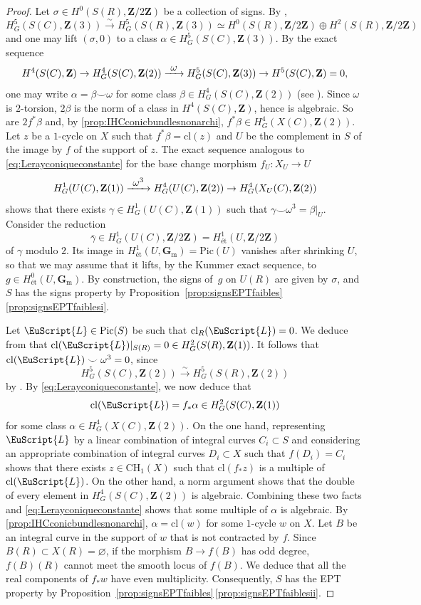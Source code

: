 \documentclass[JEP,XML,SOM,Unicode]{cedram}
\let\mathcal\EuScript
\newcommand{\To}[1]{\mathchoice{\xrightarrow{\textstyle\kern4pt#1\kern3pt}}{\stackrel{#1}{\longrightarrow}}{}{}}
\newcommand{\isom}{\stackrel{\sim}{\longrightarrow}}
\theoremstyle{plain}
\theoremstyle{definition}
\numberwithin{equation}{section}
\newcommand{\cl}{{\mathrm{cl}}}
\newcommand{\Gm}{\mathbf{G}_\mathrm{m}}
\newcommand{\Z}{{\mathbf Z}}
\newcommand{\CH}{\mathrm{CH}}
\newcommand{\Pic}{\mathrm{Pic}}
\renewcommand{\emptyset}{\varnothing}
\newcommand{\et}{\text{ét}}
\begin{document}
\begin{proof}
Let $\sigma\in H^0(S(R),\Z/2\Z)$ be a collection of signs. By \cite[\S\ref*{BW1-subsubsec:cohomological dimension}, (\ref*{BW1-eq:canonical decomposition})]{BW1},
\[
H_G^5(S(C),\Z(3))\isom H_G^5(S(R),\Z(3))\simeq H^0(S(R),\Z/2\Z)\oplus H^2(S(R),\Z/2\Z)
\]
and one may lift $(\sigma,0)$ to a class $\alpha\in H_G^5(S(C),\Z(3))$.
By the exact sequence \cite[(\ref*{BW1-eq:real-complex long 10})]{BW1}
\[
H^4(S(C),\Z)\to H^4_G(S(C),\Z(2))\To{\omega} H^5_G(S(C),\Z(3))\to H^5(S(C),\Z)=0,
\]
one may write $\alpha=\beta \smile\omega$ for some
class $\beta\in H^4_G(S(C),\Z(2))$ (see \cite[\S\ref*{BW1-subsubsec:omega}]{BW1}).
Since $\omega$ is $2$-torsion, $2\beta$ is the norm of a class in $H^4(S(C),\Z)$, hence is algebraic. So are $2f^*\beta$ and, by \eqref{prop:IHCconicbundlesnonarchi}, $f^*\beta\in H^4_G(X(C),\Z(2))$. Let $z$ be a $1$-cycle on $X$ such that $f^*\beta=\cl(z)$ and $U$ be the complement in $S$ of the image by $f$ of the support of $z$.
The exact sequence analogous to \eqref{eq:Lerayconiqueconstante} for
the base change morphism $f_U:X_U\to U$
\[
H^1_G(U(C),\Z(1))\To{\omega^3} H^4_G(U(C),\Z(2))\to H^4_G(X_U(C),\Z(2))
\]
shows that there exists $\gamma\in H^1_G(U(C),\Z(1))$ such that $\gamma\smile\omega^3=\beta|_U$.
Consider the reduction
\[
\bar{\gamma}\in H^1_G(U(C),\Z/2\Z)=H^1_\et(U,\Z/2\Z)
\]
of $\gamma$ modulo $2$.
Its image in $H^1_\et(U,\Gm)=\Pic(U)$ vanishes after shrinking $U$, so that we may assume that it lifts,
by the Kummer exact sequence, to $g\in H^0_\et(U,\Gm)$. By construction, the signs of~$g$ on $U(R)$ are given by $\sigma$, and $S$ has the signs property by Proposition~\ref{prop:signsEPTfaibles}\,\eqref{prop:signsEPTfaiblesi}.

Let $\mathcal{L}\in\Pic(S)$ be such that $\cl_{R}(\mathcal{L})=0$.
We deduce from \cite[Th.\,\ref*{BW1-th:conditions de krasnov}]{BW1} that $\cl(\mathcal{L})|_{S(R)}=0\in H^2_G(S(R),\Z(1))$.
It follows that $\cl(\mathcal{L})\smile\omega^3=0$,
since
\[
H^5_G(S(C),\Z(2))\isom H^5_G(S(R),\Z(2))
\]
by \cite[\S\ref*{BW1-subsubsec:cohomological dimension}]{BW1}.
By \eqref{eq:Lerayconiqueconstante},
we now deduce that
\[
\cl(\mathcal{L})=f_*\alpha\in H^2_G(S(C),\Z(1))
\]
for some class $\alpha\in H^4_G(X(C),\Z(2))$.
On the one hand, representing $\mathcal{L}$ by a linear combination of integral curves $C_i\subset S$ and considering an appropriate combination of integral curves $D_i\subset X$ such that $f(D_i)=C_i$ shows that there exists $z\in \CH_1(X)$ such that $\cl(f_*z)$ is a multiple of $\cl(\mathcal{L})$.
On the other hand, a norm argument shows that the double of every element in $H^4_G(S(C),\Z(2))$ is algebraic. Combining these two facts and \eqref{eq:Lerayconiqueconstante} shows that some multiple of $\alpha$ is algebraic.
By \eqref{prop:IHCconicbundlesnonarchi}, $\alpha=\cl(w)$ for some $1$-cycle $w$ on $X$. Let $B$ be an integral curve in the support of $w$ that is not contracted by $f$. Since $B(R)\subset X(R)=\emptyset$, if the morphism $B\to f(B)$ has odd degree, $f(B)(R)$ cannot meet the smooth locus of $f(B)$. We deduce that all the real components of $f_*w$ have even multiplicity. Consequently, $S$ has the EPT property by Proposition~\ref{prop:signsEPTfaibles}\,\eqref{prop:signsEPTfaiblesii}.
\end{proof}
\end{document}
